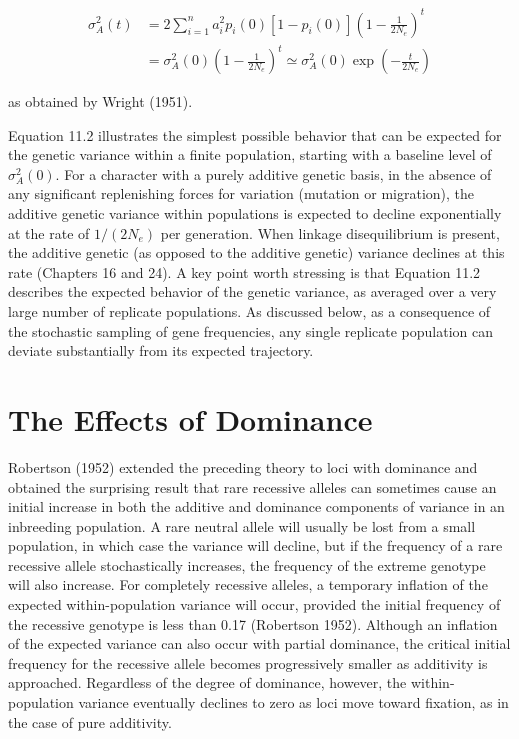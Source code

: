 \documentclass{article}
\begin{document}
\begin{equation}
\begin{aligned}\sigma_{A}^{2}(t)&=2\sum_{i=1}^{n}a_{i}^{2}p_{i}(0)[1-p_{i}(0)]\left(1-\frac{1}{2N_{e}}\right)^{t}\\&=\sigma_{A}^{2}(0)\left(1-\frac{1}{2N_{e}}\right)^{t}\simeq\sigma_{A}^{2}(0)\exp\left(-\frac{t}{2N_{e}}\right)\end{aligned}
\tag{11.2}
\label{eq:11_2}
\end{equation}

as obtained by Wright (1951).

Equation 11.2 illustrates the simplest possible behavior that can be expected for the genetic variance within a finite population, starting with a baseline level of  $ \sigma_A^2(0) $. For a character with a purely additive genetic basis, in the absence of any significant replenishing forces for variation (mutation or migration), the additive genetic variance within populations is expected to decline exponentially at the rate of  $ 1/(2N_e) $ per generation. When linkage disequilibrium is present, the additive genetic (as opposed to the additive genetic) variance declines at this rate (Chapters 16 and 24). A key point worth stressing is that Equation 11.2 describes the expected behavior of the genetic variance, as averaged over a very large number of replicate populations. As discussed below, as a consequence of the stochastic sampling of gene frequencies, any single replicate population can deviate substantially from its expected trajectory.

\section{The Effects of Dominance}
Robertson (1952) extended the preceding theory to loci with dominance and obtained the surprising result that rare recessive alleles can sometimes cause an initial increase in both the additive and dominance components of variance in an inbreeding population. A rare neutral allele will usually be lost from a small population, in which case the variance will decline, but if the frequency of a rare recessive allele stochastically increases, the frequency of the extreme genotype will also increase. For completely recessive alleles, a temporary inflation of the expected within-population variance will occur, provided the initial frequency of the recessive genotype is less than 0.17 (Robertson 1952). Although an inflation of the expected variance can also occur with partial dominance, the critical initial frequency for the recessive allele becomes progressively smaller as additivity is approached. Regardless of the degree of dominance, however, the within-population variance eventually declines to zero as loci move toward fixation, as in the case of pure additivity.
\end{document}
